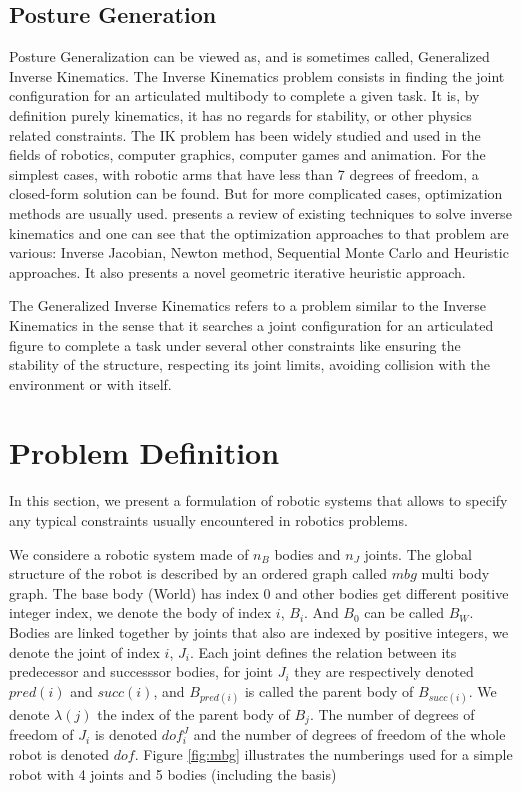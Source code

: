 \subsection{Posture Generation}
\label{sub:posture_generation}

Posture Generalization can be viewed as, and is sometimes called, Generalized Inverse Kinematics.
The Inverse Kinematics problem consists in finding the joint configuration for an articulated multibody to complete a given task.
It is, by definition purely kinematics, it has no regards for stability, or other physics related constraints.
The IK problem has been widely studied and used in the fields of robotics, computer graphics, computer games and animation.
For the simplest cases, with robotic arms that have less than 7 degrees of freedom, a closed-form solution can be found.
But for more complicated cases, optimization methods are usually used.
\cite{aristidou2009} presents a review of existing techniques to solve inverse kinematics and one can see that the optimization approaches to that problem are various: Inverse Jacobian, Newton method, Sequential Monte Carlo and Heuristic approaches. It also presents a novel geometric iterative heuristic approach.

The Generalized Inverse Kinematics refers to a problem similar to the Inverse Kinematics in the sense that it searches a joint configuration for an articulated figure to complete a task under several other constraints like ensuring the stability of the structure, respecting its joint limits, avoiding collision with the environment or with itself.


\section{Problem Definition}
\label{sec:problem_definition}

In this section, we present a formulation of robotic systems that allows to specify any typical constraints usually encountered in robotics problems.

We considere a robotic system made of $n_B$ bodies and $n_J$ joints.
The global structure of the robot is described by an ordered graph called $mbg$ multi body graph.
The base body (World) has index $0$ and other bodies get different positive integer index, we denote the body of index $i$, $B_i$. And $B_0$ can be called $B_W$.
Bodies are linked together by joints that also are indexed by positive integers, we denote the joint of index $i$, $J_i$.
Each joint defines the relation between its predecessor and successsor bodies, for joint $J_i$ they are respectively denoted $pred(i)$ and $succ(i)$, and $B_{pred(i)}$ is called the parent body of $B_{succ(i)}$.
We denote $\lambda(j)$ the index of the parent body of $B_j$.
The number of degrees of freedom of $J_i$ is denoted $dof^J_i$ and the number of degrees of freedom of the whole robot is denoted $dof$.
Figure \ref{fig:mbg} illustrates the numberings used for a simple robot with 4 joints and 5 bodies (including the basis)

